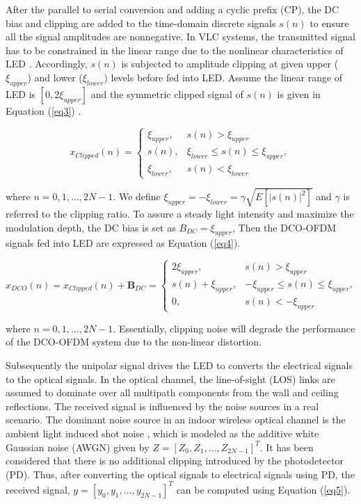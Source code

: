 \documentclass[conference]{IEEEtran}
\begin{document}
After the parallel to serial conversion and adding a cyclic prefix (CP), the DC bias and clipping are added to the time-domain discrete signals $s(n)$ to ensure all the signal amplitudes are nonnegative. In VLC systems, the transmitted signal has to be constrained in the linear range due to the nonlinear characteristics of LED \cite{b30}. Accordingly, $s(n)$ is subjected to amplitude clipping at given upper ($\xi_{upper}$) and lower ($\xi_{lower}$) levels before fed into LED. Assume the linear range of LED is $[0, 2\xi_{upper}]$ and the symmetric clipped signal of $s(n)$ is given in Equation (\ref{eq3}) \cite{b31}.

\begin{equation}
x_{Clipped}(n) =
\begin{cases}
\xi_{upper}, & s(n) > \xi_{upper} \\
s(n), & \xi_{lower} \leq s(n) \leq \xi_{upper} , \\
\xi_{lower}, & s(n) < \xi_{lower}
\end{cases}
\label{eq3}
\end{equation}

where $n = 0, 1, \dots , 2N - 1$. We define $\xi_{upper} = -\xi_{lower} = \gamma \sqrt{E[|s(n)|^2]}$ and $\gamma$ is referred to the clipping ratio. To assure a steady light intensity and maximize the modulation depth, the DC bias is set as $B_{DC} = \xi_{upper}$, Then the DCO-OFDM signals fed into LED are expressed as Equation (\ref{eq4}).

\begin{equation}
x_{DCO}(n) = x_{Clipped}(n) + \mathbf{B}_{DC} =
\begin{cases}
2\xi_{upper}, & s(n) > \xi_{upper} \\
s(n) + \xi_{upper}, & -\xi_{upper} \leq s(n) \leq \xi_{upper} , \\
0, & s(n) < -\xi_{upper}
\end{cases}
\label{eq4}
\end{equation}

where $n = 0, 1, \dots , 2N - 1$. Essentially, clipping noise will degrade the performance of the DCO-OFDM system due to the non-linear distortion.

Subsequently the unipolar signal drives the LED to converts the electrical signals to the optical signals. In the optical channel, the line-of-sight (LOS) links are assumed to dominate over all multipath components from the wall and ceiling reflections. The received signal is influenced by the noise sources in a real scenario. The dominant noise source in an indoor wireless optical channel is the ambient light induced shot noise \cite{b32}, which is modeled as the additive white Gaussian noise (AWGN) given by $Z = [Z_0, Z_1, \dots , Z_{2N-1}]^T$. It has been considered that there is no additional clipping introduced by the photodetector (PD). Thus, after converting the optical signals to electrical signals using PD, the received signal, $y = [y_0, y_1, \dots , y_{2N-1}]^T$ can be computed using Equation (\ref{eq5}).
\end{document}
